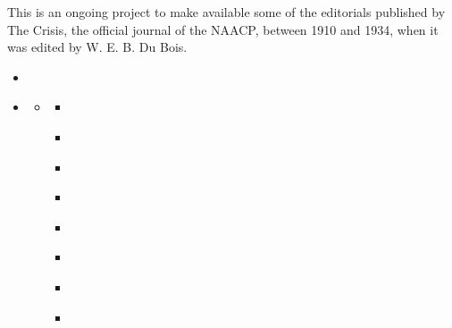 \documentclass[letterpaper,10pt,english]{jupyterBook}
\title{Dare you Fight&#58;<br/>W.E.B. Du Bois in The Crisis}
\date{Apr 12, 2022}
\author{William E.\@{} Burghardt Du Bois}
\begin{document}
\pagestyle{empty}
\sphinxmaketitle
\pagestyle{plain}
\sphinxtableofcontents
\pagestyle{normal}
\label{\detokenize{index::doc}}


\sphinxAtStartPar
This is an ongoing project to make available some of the editorials published by The Crisis, the official journal of the NAACP, between 1910 and 1934, when it was edited by W. E. B. Du Bois.
\begin{itemize}
\item {} 
\sphinxAtStartPar
{\hyperref[\detokenize{introduction::doc}]{}}

\item {} 
\sphinxAtStartPar
{\hyperref[\detokenize{Sections/socialchange::doc}]{}}
\begin{itemize}
\item {} 
\sphinxAtStartPar
{\hyperref[\detokenize{Sections/protest::doc}]{}}
\begin{itemize}
\item {} 
\sphinxAtStartPar
{\hyperref[\detokenize{Volumes/01/01/Agitation::doc}]{}}

\item {} 
\sphinxAtStartPar
{\hyperref[\detokenize{Volumes/05/05/proper_way::doc}]{}}

\item {} 
\sphinxAtStartPar
{\hyperref[\detokenize{Volumes/16/03/close_ranks::doc}]{}}

\item {} 
\sphinxAtStartPar
{\hyperref[\detokenize{Volumes/19/01/statement::doc}]{}}

\item {} 
\sphinxAtStartPar
{\hyperref[\detokenize{Volumes/12/06/negro_party::doc}]{}}

\item {} 
\sphinxAtStartPar
{\hyperref[\detokenize{Volumes/22/01/inter-racial_comity::doc}]{}}

\item {} 
\sphinxAtStartPar
{\hyperref[\detokenize{Volumes/24/01/publicity::doc}]{}}

\item {} 
\sphinxAtStartPar
{\hyperref[\detokenize{Volumes/41/05/violence::doc}]{}}


\end{itemize}
\end{itemize}
\end{itemize}
\end{document}
